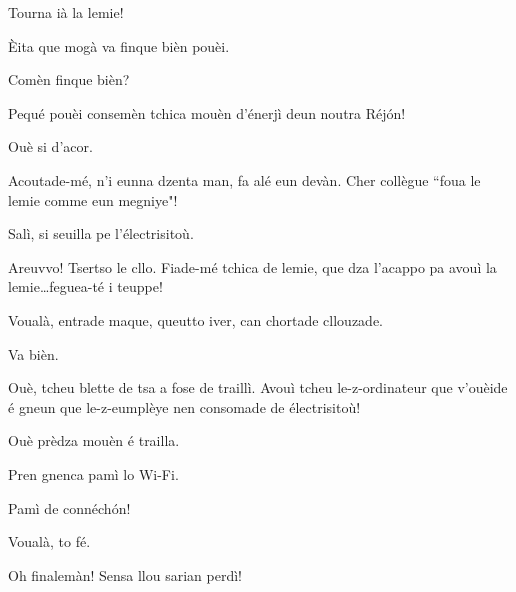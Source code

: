 \begin{drama}




\Tuenospeaks Tourna ià la lemie!

\Richardspeaks \`Eita que mogà va finque bièn pouèi.

\Tuenospeaks Comèn finque bièn?

\Richardspeaks Pequé pouèi consemèn tchica mouèn d'énerjì deun noutra Réj\'on!

\Gerominespeaks Ouè si d'acor.

\Richardspeaks Acoutade-mé, n'i eunna dzenta man, fa alé eun devàn. Cher collègue ``foua le lemie comme eun megniye"! 


\Elettricistaspeaks{} Salì, si seuilla pe l'électrisitoù.

\Sandrinospeaks Areuvvo! Tsertso le cllo. Fiade-mé tchica de lemie, que dza l'acappo pa avouì la lemie\ldots feguea-té i teuppe!


\Sandrinospeaks Voualà, entrade maque, queutto iver, can chortade cllouzade.

\Elettricistaspeaks Va bièn.


\Elettricistaspeaks{} Ouè, tcheu blette de tsa a fose de traillì. Avouì tcheu le-z-ordinateur que v'ouèide é gneun que le-z-eumplèye nen consomade de électrisitoù! 

\Saventaspeaks{} Ouè prèdza mouèn é trailla.

\Gerominespeaks Pren gnenca pamì lo Wi-Fi.

\Saventaspeaks Pamì de connéch\'on!


\Elettricistaspeaks Voualà, to fé.

\Richardspeaks{} Oh finalemàn! Sensa llou sarian perdì!


\end{drama}
